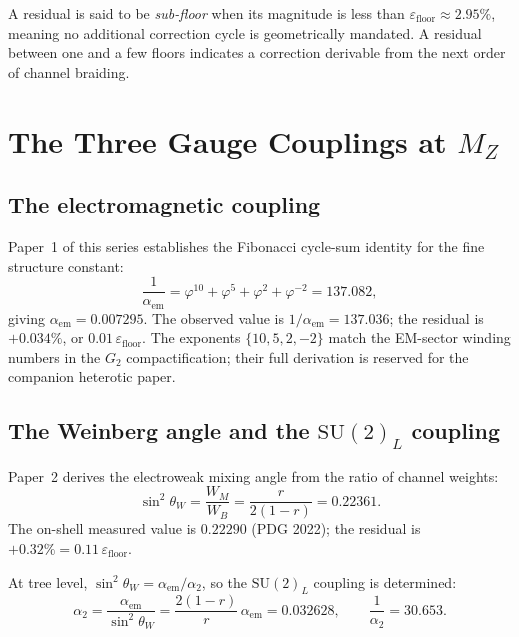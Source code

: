\documentclass[12pt]{article}
\begin{document}
A residual is said to be \emph{sub-floor} when its magnitude is less than
$\varepsilon_{\text{floor}} \approx 2.95\%$, meaning no additional correction
cycle is geometrically mandated. A residual between one and a few floors
indicates a correction derivable from the next order of channel braiding.

\section{The Three Gauge Couplings at $M_Z$}

\subsection{The electromagnetic coupling}

Paper~1 of this series establishes the Fibonacci cycle-sum identity for the
fine structure constant:
\begin{equation}
  \frac{1}{\alpha_{\text{em}}}
  = \varphi^{10} + \varphi^5 + \varphi^2 + \varphi^{-2}
  = 137.082,
  \label{eq:alpha_em}
\end{equation}
giving $\alpha_{\text{em}} = 0.007295$. The observed value is
$1/\alpha_{\text{em}} = 137.036$; the residual is $+0.034\%$, or
$0.01\,\varepsilon_{\text{floor}}$. The exponents $\{10, 5, 2, -2\}$ match
the EM-sector winding numbers in the $G_2$ compactification; their full
derivation is reserved for the companion heterotic paper.

\subsection{The Weinberg angle and the $\mathrm{SU}(2)_L$ coupling}

Paper~2 derives the electroweak mixing angle from the ratio of channel
weights:
\begin{equation}
  \sin^2\!\theta_W
  = \frac{W_M}{W_B}
  = \frac{r}{2(1-r)}
  = 0.22361.
  \label{eq:sw2}
\end{equation}
The on-shell measured value is $0.22290$ (PDG 2022); the residual is
$+0.32\% = 0.11\,\varepsilon_{\text{floor}}$.

At tree level, $\sin^2\!\theta_W = \alpha_{\text{em}}/\alpha_2$, so the
$\mathrm{SU}(2)_L$ coupling is determined:
\begin{equation}
  \alpha_2
  = \frac{\alpha_{\text{em}}}{\sin^2\!\theta_W}
  = \frac{2(1-r)}{r}\,\alpha_{\text{em}}
  = 0.032628,
  \qquad
  \frac{1}{\alpha_2} = 30.653.
  \label{eq:alpha2}
\end{equation}
\end{document}
